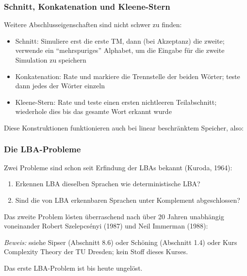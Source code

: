 \documentclass[aspectratio=1610,onlymath]{beamer}
\begin{document}
\begin{frame}\frametitle{Schnitt, Konkatenation und Kleene-Stern}

Weitere Abschlusseigenschaften sind nicht schwer zu finden:

\begin{itemize}
\item \alert{Schnitt:} Simuliere erst die erste TM, dann (bei Akzeptanz) die zweite; verwende ein "`mehrspuriges"' Alphabet, um die Eingabe für die zweite Simulation zu speichern
\item \alert{Konkatenation:} Rate und markiere die Trennstelle der beiden Wörter; teste dann jedes der Wörter einzeln
\item \alert{Kleene-Stern:} Rate und teste einen ersten nichtleeren Teilabschnitt; wiederhole dies bis das gesamte Wort erkannt wurde
\end{itemize}\pause

Diese Konstruktionen funktionieren auch bei linear beschränktem Speicher, also:\medskip


\end{frame}

\begin{frame}\frametitle{Die LBA-Probleme}

Zwei Probleme sind schon seit Erfindung der LBAs bekannt (Kuroda, 1964):
\begin{enumerate}[(1)]
\item Erkennen LBA dieselben Sprachen wie deterministische LBA?
\item Sind die von LBA erkennbaren Sprachen unter Komplement abgeschlossen?
\end{enumerate}\pause

Das zweite Problem lösten überraschend nach über 20 Jahren unabhängig voneinander Robert Szelepcsényi (1987) und Neil Immerman (1988):\medskip

\medskip

\emph{Beweis:} ssiehe Sipser (Abschnitt 8.6) oder Schöning (Abschnitt 1.4) oder Kurs \alert{Complexity Theory} der TU Dresden; kein Stoff dieses Kurses.
\medskip\pause

Das erste LBA-Problem ist bis heute ungelöst.

\end{frame}
\end{document}
